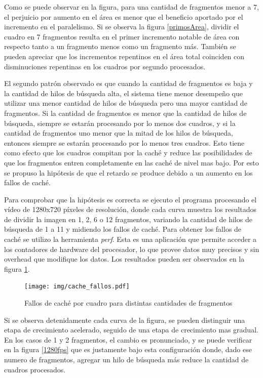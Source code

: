 Como se puede observar en la figura, para una cantidad de fragmentos menor a 7,
el perjuicio por aumento en el área es menor que el beneficio aportado por el
incremento en el paralelismo. Si se observa la figura \ref{primosArea}, dividir
el cuadro en 7 fragmentos resulta en el primer incremento notable de área con
respecto tanto a un fragmento menos como un fragmento más. También se pueden
apreciar que los incrementos repentinos en el área total coinciden con
disminuciones repentinas en los cuadros por segundo procesados.

El segundo patrón observado es que cuando la cantidad de fragmentos es baja y la
cantidad de hilos de búsqueda alta, el sistema tiene menor desempeño que
utilizar una menor cantidad de hilos de búsqueda pero una mayor cantidad de
fragmentos. Si la cantidad de fragmentos es menor que la cantidad de hilos de
búsqueda, siempre se estarán procesando por lo menos dos cuadros, y si la
cantidad de fragmentos uno menor que la mitad de los hilos de búsqueda, entonces
siempre se estarán procesando por lo menos tres cuadros. Esto tiene como efecto
que los cuadros compitan por la caché y reduce las posibilidades de que los
fragmentos entren completamente en las caché de nivel mas bajo. Por esto se
propuso la hipótesis de que el retardo se produce debido a un aumento en los
fallos de caché.

Para comprobar que la hipótesis es correcta se ejecuto el programa procesando el
vídeo de 1280x720 píxeles de resolución, donde cada curva muestra los resultados
de dividir la imagen en 1, 2, 6 o 12 fragmentos, variando la cantidad de hilos
de búsqueda de 1 a 11 y midiendo los fallos de caché. Para obtener los fallos de
caché se utilizo la herramienta \emph{perf}. Esta es una aplicación que permite
acceder a los contadores de hardware del procesador, lo que provee datos muy
precisos y sin overhead que modifique los datos. Los resultados pueden ser
observados en la figura \ref{cacheFallos}.

\begin{figure}[!h]

	\texttt{[image: img/cache\_fallos.pdf]}
	\caption{Fallos de caché por cuadro para distintas cantidades de
	fragmentos}
	\label{cacheFallos}

\end{figure}

Si se observa detenidamente cada curva de la figura, se pueden distinguir una
etapa de crecimiento acelerado, seguido de una etapa de crecimiento mas gradual.
En los casos de 1 y 2 fragmentos, el cambio es pronunciado, y se puede verificar
en la figura \ref{1280fps} que es justamente bajo esta configuración donde, dado
ese numero de fragmentos, agregar un hilo de búsqueda más reduce la cantidad de
cuadros procesados.

